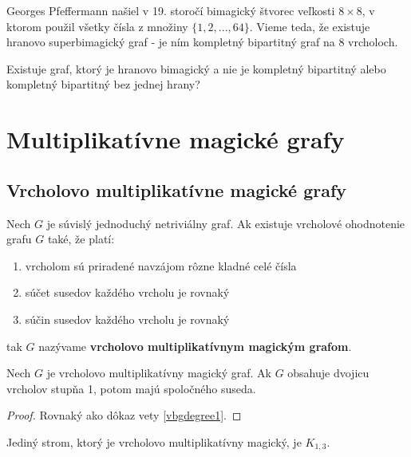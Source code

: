 Georges Pfeffermann našiel v 19. storočí bimagický štvorec veľkosti $8 \times 8$, v ktorom použil všetky čísla z množiny $\{1, 2, ... , 64\}$. Vieme teda, že existuje hranovo superbimagický graf - je ním kompletný bipartitný graf na $8$ vrcholoch.

\begin{subhypothesis} Existuje graf, ktorý je hranovo bimagický a nie je kompletný bipartitný alebo kompletný bipartitný bez jednej hrany?
\end{subhypothesis} 



\section{Multiplikatívne magické grafy}

\subsection{Vrcholovo multiplikatívne magické grafy}

\begin{subdefinition} Nech $G$ je súvislý jednoduchý netriviálny graf. Ak existuje vrcholové ohodnotenie grafu $G$ také, že platí:

\begin{enumerate}
\item vrcholom sú priradené navzájom rôzne kladné celé čísla
\item súčet susedov každého vrcholu je rovnaký
\item súčin susedov každého vrcholu je rovnaký
\end{enumerate}

tak $G$ nazývame \textbf{vrcholovo multiplikatívnym magickým grafom}.
\end{subdefinition} 

\begin{subtheorem}
\label{vmmgdegree1}
Nech $G$ je vrcholovo multiplikatívny magický graf. Ak $G$ obsahuje dvojicu vrcholov stupňa 1, potom majú spoločného suseda.
\end{subtheorem}

\begin{proof} Rovnaký ako dôkaz vety \ref{vbgdegree1}.
\end{proof}

\begin{subconsequence} Jediný strom, ktorý je vrcholovo multiplikatívny magický, je $K_{1,3}$.
\end{subconsequence}


